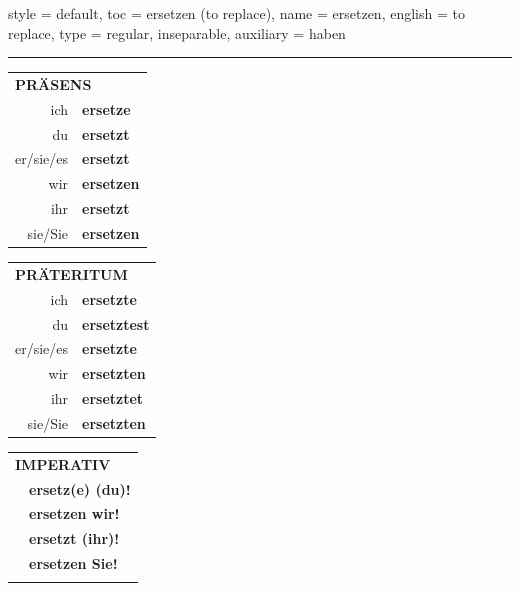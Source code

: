 \begin{verbentry}{
  style = {default},
  toc = {ersetzen (to replace)},
  name = {ersetzen},
  english = {to replace},
  type = {regular, inseparable},
  auxiliary = {haben}
}
 
    
     \vspace{5pt}

    \hrule
    
    \vspace{5pt}

  \begin{tabular}{rl}
     \multicolumn{2}{l}{\textbf{PRÄSENS} }\\
    ich & \textbf{ersetze}\\
    du & \textbf{ersetzt}\\
    er/sie/es & \textbf{ersetzt}\\
    wir & \textbf{ersetzen}\\
    ihr & \textbf{ersetzt}\\
    sie/Sie & \textbf{ersetzen}\\
  \end{tabular}
  \hfill
     \begin{tabular}{rl}
    \multicolumn{2}{l}{\textbf{PRÄTERITUM} }\\
    ich & \textbf{ersetzte}\\
    du & \textbf{ersetztest}\\
    er/sie/es & \textbf{ersetzte}\\
    wir & \textbf{ersetzten}\\
    ihr & \textbf{ersetztet}\\
    sie/Sie & \textbf{ersetzten}\\
  \end{tabular}
  \hfill
  \begin{tabular}{rl}
     \multicolumn{2}{l}{\textbf{IMPERATIV} }\\
   & \textbf{ersetz(e) (du)!}\\
   & \textbf{ersetzen wir!}\\
   & \textbf{ersetzt (ihr)!}\\
   & \textbf{ersetzen Sie!}\\
   & \vspace{10pt}
  \end{tabular}

    \vspace{10pt}


\end{verbentry}
